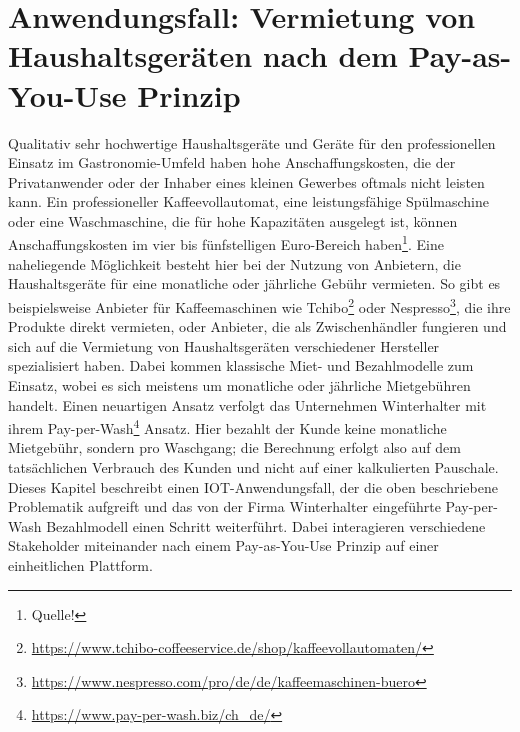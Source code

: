 \chapter{Anwendungsfall: Vermietung von Haushaltsgeräten nach dem Pay-as-You-Use Prinzip}
\label{ch:iot_usecase}
Qualitativ sehr hochwertige Haushaltsgeräte und Geräte für den professionellen Einsatz im Gastronomie-Umfeld haben hohe Anschaffungskosten, die der Privatanwender oder der Inhaber eines kleinen Gewerbes oftmals nicht leisten kann. Ein professioneller Kaffeevollautomat, eine leistungsfähige Spülmaschine oder eine Waschmaschine, die für hohe Kapazitäten ausgelegt ist, können Anschaffungskosten im vier bis fünfstelligen Euro-Bereich haben\footnote{Quelle!}. Eine naheliegende Möglichkeit besteht hier bei der Nutzung von Anbietern, die Haushaltsgeräte für eine monatliche oder jährliche Gebühr vermieten. So gibt es beispielsweise Anbieter für Kaffeemaschinen wie Tchibo\footnote{\url{https://www.tchibo-coffeeservice.de/shop/kaffeevollautomaten/}} oder Nespresso\footnote{\url{https://www.nespresso.com/pro/de/de/kaffeemaschinen-buero}}, die ihre Produkte direkt vermieten, oder Anbieter, die als Zwischenhändler fungieren und sich auf die Vermietung von Haushaltsgeräten verschiedener Hersteller spezialisiert haben. Dabei kommen klassische Miet- und Bezahlmodelle zum Einsatz, wobei es sich meistens um monatliche oder jährliche Mietgebühren handelt. Einen neuartigen Ansatz verfolgt das Unternehmen Winterhalter mit ihrem Pay-per-Wash\footnote{\url{https://www.pay-per-wash.biz/ch\_de/}} Ansatz. Hier bezahlt der Kunde keine monatliche Mietgebühr, sondern pro Waschgang; die Berechnung erfolgt also auf dem tatsächlichen Verbrauch des Kunden und nicht auf einer kalkulierten Pauschale.\\
Dieses Kapitel beschreibt einen IOT-Anwendungsfall, der die oben beschriebene Problematik aufgreift und das von der Firma Winterhalter eingeführte Pay-per-Wash Bezahlmodell einen Schritt weiterführt. Dabei interagieren verschiedene Stakeholder miteinander nach einem Pay-as-You-Use Prinzip auf einer einheitlichen Plattform.

%
%
